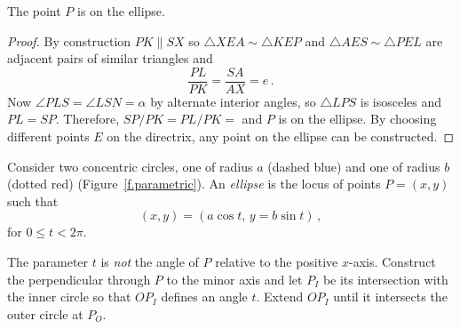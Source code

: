 \begin{theorem}\label{thm.point-on-an-ellipse}
The point $P$ is on the ellipse.
\end{theorem}
\begin{proof}
By construction $PK\parallel SX$ so $\triangle XEA\sim \triangle KEP$ and $\triangle AES\sim \triangle PEL$ are adjacent pairs of similar triangles and
\[
\frac{PL}{PK}=\frac{SA}{AX}=e\,.
\]
Now $\angle PLS = \angle LSN=\alpha$ by alternate interior angles, so $\triangle LPS$ is isosceles and $PL=SP$. Therefore, $SP/PK=PL/PK=$ and $P$ is on the ellipse. By choosing different points $E$ on the directrix, any point on the ellipse can be constructed.\hqed
\end{proof}

\begin{definition}
Consider two concentric circles, one of radius $a$ (dashed blue) and one of radius $b$ (dotted red) (Figure~\ref{f.parametric}). An \emph{ellipse} is the locus of points $P=(x,y)$ such that
\[
(x,y)= (a\cos t,\, y = b \sin t)\,,
\]
for $0\le t < 2\pi$.
\end{definition}
The parameter $t$ is \emph{not} the angle of $P$ relative to the positive $x$-axis. Construct the perpendicular through $P$ to the minor axis and let $P_I$ be its intersection with the inner circle so that $OP_I$ defines an angle $t$.  Extend $OP_I$ until it intersects the outer circle at $P_O$. 


